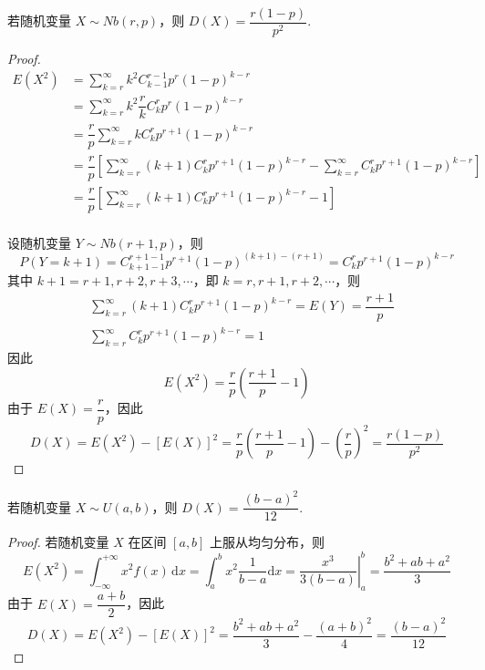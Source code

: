 \begin{conclusion}
    \indent 若随机变量 $X \sim Nb(r,p)$，则 $D(X) = \dfrac{r(1-p)}{p^2}$.
\end{conclusion}

\begin{proof}
    $$
    \begin{aligned}
        E(X^2) &= \sum_{k=r}^{\infty} k^2 C_{k-1}^{r-1} p^r (1-p)^{k-r} \\
        &= \sum_{k=r}^{\infty} k^2 \dfrac{r}{k} C_{k}^{r} p^r (1-p)^{k-r} \\
        &= \dfrac{r}{p} \sum_{k=r}^{\infty} k C_{k}^{r} p^{r+1} (1-p)^{k-r} \\
        &= \dfrac{r}{p} \left[ \sum_{k=r}^{\infty} (k+1) C_{k}^{r} p^{r+1} (1-p)^{k-r} - \sum_{k=r}^{\infty} C_{k}^{r} p^{r+1} (1-p)^{k-r} \right] \\
        &= \dfrac{r}{p} \left[ \sum_{k=r}^{\infty} (k+1) C_{k}^{r} p^{r+1} (1-p)^{k-r} - 1 \right] \\
    \end{aligned}
    $$

    设随机变量 $Y \sim Nb(r+1,p)$，则
    $$
    P(Y=k+1) = C_{k+1-1}^{r+1-1} p^{r+1} (1-p)^{(k+1)-(r+1)} = C_{k}^{r} p^{r+1} (1-p)^{k-r}
    $$
    其中 $k+1 = r+1, r+2, r+3, \cdots$，即 $k = r, r+1, r+2, \cdots$，则
    $$
    \begin{aligned}
        & \sum_{k=r}^{\infty} (k+1) C_{k}^{r} p^{r+1} (1-p)^{k-r} = E(Y) = \dfrac{r+1}{p} \\
        & \sum_{k=r}^{\infty} C_{k}^{r} p^{r+1} (1-p)^{k-r} = 1
    \end{aligned}
    $$
    因此
    $$
    E(X^2) = \dfrac{r}{p} \left( \dfrac{r+1}{p} - 1 \right)
    $$
    由于 $E(X) = \dfrac{r}{p}$，因此
    $$
    D(X) = E(X^2) - [E(X)]^2 = \dfrac{r}{p} \left( \dfrac{r+1}{p} - 1 \right) - \left( \dfrac{r}{p} \right)^2 = \dfrac{r(1-p)}{p^2}
    $$
\end{proof}

\begin{conclusion}
    \indent 若随机变量 $X \sim U(a,b)$，则 $D(X) = \dfrac{(b-a)^2}{12}$.
\end{conclusion}

\begin{proof}
    若随机变量 $X$ 在区间 $[a,b]$ 上服从均匀分布，则
    $$
    E(X^2) = \int_{-\infty}^{+\infty} x^2 f(x) \, \text{d}x = \int_a^b x^2 \dfrac{1}{b-a} \text{d}x = \left. \dfrac{x^3}{3(b-a)} \right|_a^b = \dfrac{b^2 + ab + a^2}{3}
    $$
    由于 $E(X) = \dfrac{a+b}{2}$，因此
    $$
    D(X) = E(X^2) - [E(X)]^2 = \dfrac{b^2 + ab + a^2}{3} - \dfrac{(a+b)^2}{4} = \dfrac{(b-a)^2}{12}
    $$
\end{proof}

